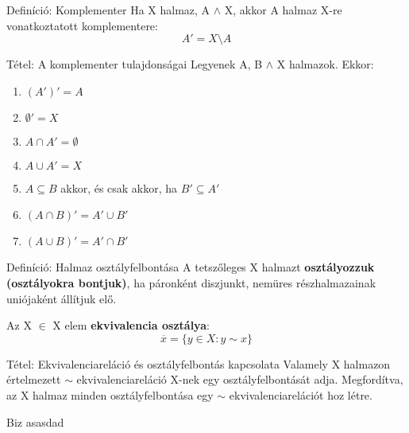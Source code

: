 \documentclass{beamer}
\begin{document}
\begin{frame}

\begin{block}{Definíció: Komplementer}
Ha X halmaz, A $\wedge$ X, akkor A halmaz X-re vonatkoztatott komplementere:\\
$$A' = X \setminus A$$
\end{block}

\begin{block}{Tétel: A komplementer tulajdonságai}
Legyenek A, B $\wedge$ X halmazok. Ekkor:

\begin{enumerate}
\item $(A')' = A$
\item $\emptyset' = X$
\item $A \cap A' = \emptyset$
\item $A \cup A' = X$
\item $A \subseteq B$ akkor, és csak akkor, ha $B' \subseteq A'$
\item $(A \cap B)' = A' \cup B'$
\item $(A \cup B)' = A' \cap B'$
\end{enumerate}
\end{block}

\end{frame}

\begin{frame}

\begin{block}{Definíció: Halmaz osztályfelbontása}
A tetszőleges X halmazt \textbf{osztályozzuk (osztályokra bontjuk)}, ha páronként diszjunkt, nemüres részhalmazainak uniójaként állítjuk elő.
\end{block}

\begin{block}{Az X $\in$ X elem \textbf{ekvivalencia osztálya}:}
$$\overline{x} = \{y \in X : y \sim x\}$$
\end{block}

\begin{block}{Tétel: Ekvivalenciareláció és osztályfelbontás kapcsolata}
Valamely X halmazon értelmezett $\sim$ ekvivalenciareláció X-nek egy osztályfelbontását adja. Megfordítva, az X halmaz minden osztályfelbontása egy $\sim$ ekvivalenciarelációt hoz létre.
\end{block}

\begin{block}{Biz}
asasdad
\end{block}

\end{frame}
\end{document}
